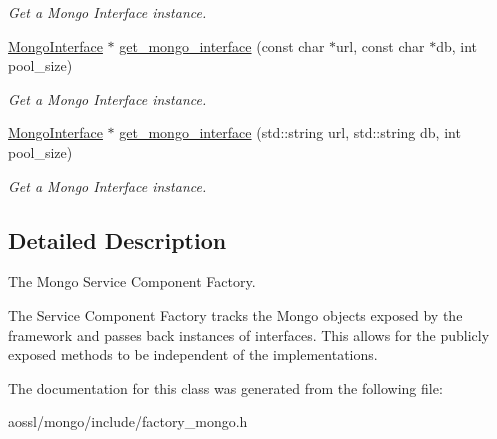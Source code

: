 \begin{DoxyCompactItemize}
\begin{DoxyCompactList}\small\item\em Get a Mongo Interface instance. \end{DoxyCompactList}\item 
\hyperlink{classMongoInterface}{Mongo\+Interface} $\ast$ \hyperlink{classMongoComponentFactory_a16b0cd08ee59bfb951b89ddd0a47f18e}{get\+\_\+mongo\+\_\+interface} (const char $\ast$url, const char $\ast$db, int pool\+\_\+size)\hypertarget{classMongoComponentFactory_a16b0cd08ee59bfb951b89ddd0a47f18e}{}\label{classMongoComponentFactory_a16b0cd08ee59bfb951b89ddd0a47f18e}

\begin{DoxyCompactList}\small\item\em Get a Mongo Interface instance. \end{DoxyCompactList}\item 
\hyperlink{classMongoInterface}{Mongo\+Interface} $\ast$ \hyperlink{classMongoComponentFactory_a22622652c551250f1dbefd4a713960cf}{get\+\_\+mongo\+\_\+interface} (std\+::string url, std\+::string db, int pool\+\_\+size)\hypertarget{classMongoComponentFactory_a22622652c551250f1dbefd4a713960cf}{}\label{classMongoComponentFactory_a22622652c551250f1dbefd4a713960cf}

\begin{DoxyCompactList}\small\item\em Get a Mongo Interface instance. \end{DoxyCompactList}\end{DoxyCompactItemize}


\subsection{Detailed Description}
The Mongo Service Component Factory. 

The Service Component Factory tracks the Mongo objects exposed by the framework and passes back instances of interfaces. This allows for the publicly exposed methods to be independent of the implementations. 

The documentation for this class was generated from the following file\+:\begin{DoxyCompactItemize}
\item 
aossl/mongo/include/factory\+\_\+mongo.\+h\end{DoxyCompactItemize}
